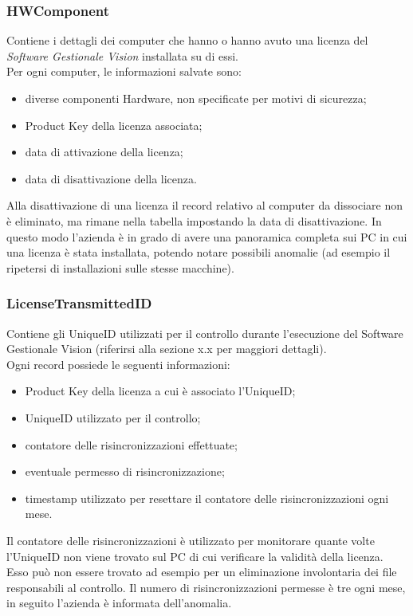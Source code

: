 \subsubsection{HWComponent}

Contiene i dettagli dei computer che hanno o hanno avuto una licenza del \textit{Software Gestionale Vision} installata su di essi. \\Per ogni computer, le informazioni salvate sono:

\begin{itemize}
\item diverse componenti Hardware, non specificate per motivi di sicurezza;
\item Product Key della licenza associata;
\item data di attivazione della licenza;
\item data di disattivazione della licenza.
\end{itemize}

Alla disattivazione di una licenza il record relativo al computer da dissociare non è eliminato, ma rimane nella tabella impostando la data di disattivazione. In questo modo l'azienda è in grado di avere una panoramica completa sui PC in cui una licenza è stata installata, potendo notare possibili anomalie (ad esempio il ripetersi di installazioni sulle stesse macchine). 

\subsubsection{LicenseTransmittedID}

Contiene gli UniqueID utilizzati per il controllo durante l’esecuzione del Software Gestionale Vision (riferirsi alla sezione x.x per maggiori dettagli). \\Ogni record possiede le seguenti informazioni:

\begin{itemize}
\item Product Key della licenza a cui è associato l'UniqueID;
\item UniqueID utilizzato per il controllo;
\item contatore delle risincronizzazioni effettuate;
\item eventuale permesso di risincronizzazione;
\item timestamp utilizzato per resettare il contatore delle risincronizzazioni ogni mese.
\end{itemize}

Il contatore delle risincronizzazioni è utilizzato per monitorare quante volte l'UniqueID non viene trovato sul PC di cui verificare la validità della licenza. Esso può non essere trovato ad esempio per un eliminazione involontaria dei file responsabili al controllo. Il numero di risincronizzazioni permesse è tre ogni mese, in seguito l'azienda è informata dell'anomalia.


